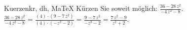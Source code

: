 \begin{MAufgabe}{Kuerzen}{kr, dh, MaTeX}
K\"urzen Sie soweit m\"oglich: $\frac{36 - 28\, z^2}{ - 4\, z^2 - 8}$.\\ 
\ifLsg\MLoesung
\quad $\frac{36 - 28\, z^2}{ - 4\, z^2 - 8}=\frac{(4)\cdot(9 - 7\, z^2)}{(4)\cdot( - z^2 - 2)}=\frac{9 - 7\, z^2}{ - z^2 - 2}=\frac{7\, z^2 - 9}{z^2 + 2}$.\else\relax\fi
 \end{MAufgabe}